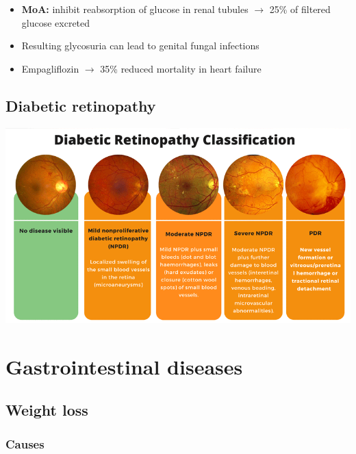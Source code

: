 \documentclass[
  12pt,
]{memoir}
\providecommand{\tightlist}{%
  \setlength{\itemsep}{0pt}\setlength{\parskip}{0pt}}
\begin{document}
\begin{itemize}
  \begin{itemize}
  \tightlist
  \item
    \textbf{MoA:} inhibit reabsorption of glucose in renal tubules
    \(\rightarrow\) 25\% of filtered glucose excreted
  \item
    Resulting glycosuria can lead to genital fungal infections
  \item
    Empagliflozin \(\rightarrow\) 35\% reduced mortality in heart
    failure
  \end{itemize}
\end{itemize}

\pagebreak

\hypertarget{diabetic-retinopathy}{%
\section{Diabetic retinopathy}\label{diabetic-retinopathy}}

\includegraphics[width=.8\textwidth]{../assets/med/diabetic-retino.png}

\pagebreak

\hypertarget{gastrointestinal-diseases}{%
\chapter{Gastrointestinal diseases}\label{gastrointestinal-diseases}}

\hypertarget{weight-loss}{%
\section{Weight loss}\label{weight-loss}}

\hypertarget{causes-5}{%
\subsection{Causes}\label{causes-5}}
\end{document}
